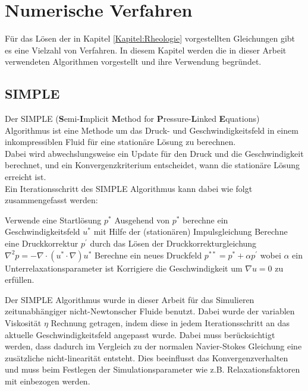 \section{Numerische Verfahren}
\label{Kapitel:Numerik}
Für das Lösen der in Kapitel \ref{Kapitel:Rheologie} vorgestellten Gleichungen gibt es eine Vielzahl von Verfahren. In diesem Kapitel werden die in dieser Arbeit verwendeten Algorithmen vorgestellt und ihre Verwendung begründet.

\subsection{SIMPLE}
Der SIMPLE (\textbf{S}emi-\textbf{I}mplicit \textbf{M}ethod for \textbf{P}ressure-\textbf{L}inked \textbf{E}quations) Algorithmus  ist eine Methode um das Druck- und Geschwindigkeitsfeld in einem inkompressiblen Fluid für eine stationäre Lösung zu berechnen.\\
Dabei wird abwechslungsweise ein Update für den Druck und die Geschwindigkeit berechnet, und ein Konvergenzkriterium entscheidet, wann die stationäre Lösung erreicht ist.\\
Ein Iterationsschritt des SIMPLE Algorithmus kann dabei wie folgt zusammengefasst werden:
\begin{outline}[enumerate]
    \1 Verwende eine Startlösung $p^*$
    \1 Ausgehend von $p^*$ berechne ein Geschwindigkeitsfeld $u^*$ mit Hilfe der (stationären) Impulsgleichung
    \1 Berechne eine Druckkorrektur $p^{'}$ durch das Lösen der Druckkorrekturgleichung $\nabla^2p=-\nabla \cdot \left( u^*\cdot\nabla \right)u^*$
    \1 Berechne ein neues Druckfeld $p^{**}=p^*+\alpha p^{'}$ wobei $\alpha$ ein Unterrelaxationsparameter ist
    \1 Korrigiere die Geschwindigkeit um $\nabla u=0$ zu erfüllen.
\end{outline}

Der SIMPLE Algorithmus wurde in dieser Arbeit für das Simulieren zeitunabhängiger nicht-Newtonscher Fluide benutzt. Dabei wurde der variablen Viskosität $\eta$ Rechnung getragen, indem diese in jedem Iterationsschritt an das aktuelle Geschwindigkeitsfeld angepasst wurde. Dabei muss berücksichtigt werden, dass dadurch im Vergleich zu der normalen Navier-Stokes Gleichung eine zusätzliche nicht-linearität entsteht. Dies beeinflusst das Konvergenzverhalten und muss beim Festlegen der Simulationsparameter wie z.B. Relaxationsfaktoren mit einbezogen werden.

